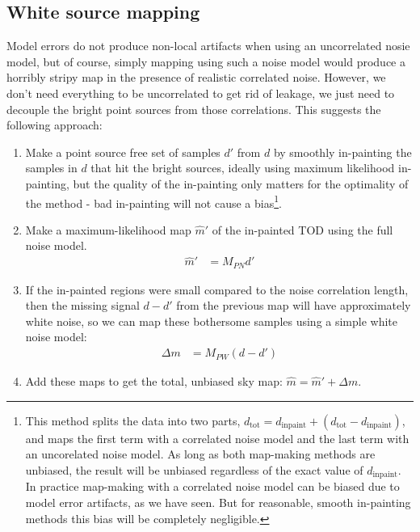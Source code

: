 \documentclass{article}
\begin{document}
\subsection{White source mapping}
Model errors do not produce non-local artifacts when using an uncorrelated nosie model,
but of course, simply mapping using such a noise model would produce a horribly stripy
map in the presence of realistic correlated noise. However, we don't need everything to
be uncorrelated to get rid of leakage, we just need to decouple the bright point sources
from those correlations. This suggests the following approach:
\begin{enumerate}
	\item Make a point source free set of samples $d'$ from $d$ by smoothly in-painting the samples in $d$
		that hit the bright sources, ideally using maximum likelihood in-painting, but the quality of the
		in-painting only matters for the optimality of the method - bad in-painting will not cause a bias\footnote{
			This method splits the data into two parts, $d_\textrm{tot} = d_\textrm{inpaint} +
			(d_\textrm{tot}-d_\textrm{inpaint})$, and maps the first term with a correlated noise model
			and the last term with an uncorelated noise model. As long as both map-making methods
			are unbiased, the result will be unbiased regardless of the exact value of $d_\textrm{inpaint}$.
			In practice map-making with a correlated noise model can be biased due to model error
			artifacts, as we have seen. But for reasonable, smooth in-painting methods this bias
			will be completely negligible.}.
	\item Make a maximum-likelihood map $\hat m'$ of the in-painted TOD using the full noise model.
		\begin{align}
		\hat m' &= M_{PN} d'
		\end{align}
	\item If the in-painted regions were small compared to the noise correlation length, then
		the missing signal $d-d'$ from the previous map will have approximately white noise,
		so we can map these bothersome samples using a simple white noise model:
		\begin{align}
		\Delta m &= M_{PW}(d-d')
		\end{align}
	\item Add these maps to get the total, unbiased sky map: $\hat m = \hat m' + \Delta m$.
\end{enumerate}
\end{document}
